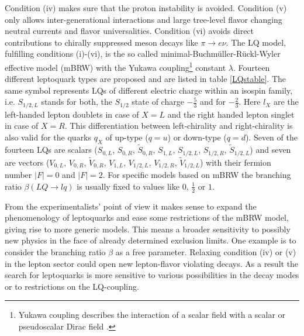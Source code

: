 Condition (iv) makes sure that the proton instability is avoided. Condition (v) only allows inter-generational interactions and large tree-level flavor changing neutral currents and flavor universalities. Condition (vi) avoids direct contributions to chirally suppressed meson decays like $\pi\rightarrow e\nu$. The LQ model, fulfilling conditions (i)-(vi), is the so called minimal-Buchm\"{u}ller-R\"{u}ckl-Wyler effective model (mBRW) with the Yukawa coupling\footnote{Yukawa coupling describes the interaction of a scalar field with a scalar or pseudoscalar Dirac field \cite{Peskin}.} constant $\lambda$. \cite{Kuze}\newline
Fourteen different leptoquark types are proposed and are listed in table \ref{LQstable}. The same symbol represents LQs of different electric charge within an isospin family, i.e. $S_{1/2,L}$ stands for both, the $S_{1/2}$ state of charge $-\frac53$ and for $-\frac23$. Here $l_X$ are the left-handed lepton doublets in case of $X=L$ and the right handed lepton singlet in case of $X=R$. This differentiation between left-chirality and right-chirality is also valid for the quarks $q_X$ of up-type ($q=u$) or down-type ($q=d$). Seven of the fourteen LQs are scalars ($S_{0,L}$, $S_{0,R}$, $\tilde{S}_{0,R}$, $S_{1,L}$, $S_{1/2,L}$, $S_{1/2,R}$, $\tilde{S}_{1/2,L}$) and seven are vectors ($V_{0,L}$, $V_{0,R}$, $\tilde{V}_{0,R}$, $V_{1,L}$, $V_{1/2,L}$, $V_{1/2,R}$, $\tilde{V}_{1/2,L}$) with their fermion number $|F|=0$ and $|F|=2$. For specific models based on mBRW the branching ratio $\beta(LQ\rightarrow lq)$ is usually fixed to values like $0$, $\frac12$ or $1$. \cite{Kuze}\par
From the experimentalists' point of view it makes sense to expand the phenomenology of leptoquarks and ease some restrictions of the mBRW model, giving rise to more generic models. This means a broader sensitivity to possibly new physics in the face of already determined exclusion limits. One example is to consider the  branching ratio $\beta$ as a free parameter. Relaxing condition (iv) or (v) in the lepton sector could open new lepton-flavor violating decays. As a result the search for leptoquarks is more sensitive to various possibilities in the decay modes or to restrictions on the LQ-coupling. \cite{Kuze}
%
%
